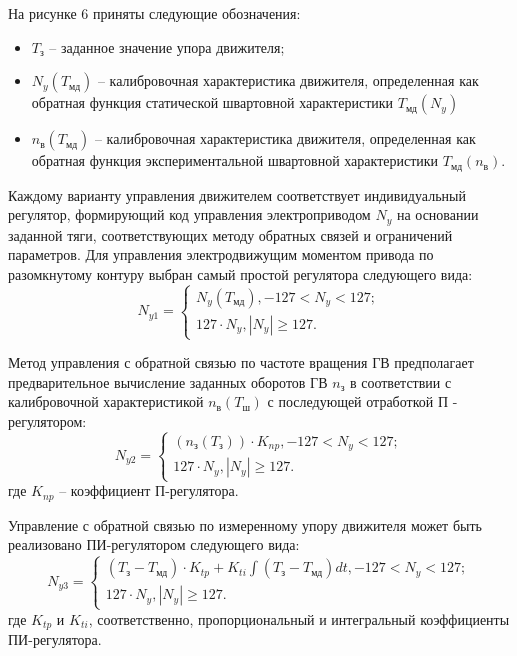 На рисунке 6 приняты следующие обозначения:  
\begin{itemize}
    \item $T_{\text{з}}$ -- заданное значение упора движителя;
    \item $N_y(T_{\text{мд}})$ -- калибровочная характеристика движителя, определенная как обратная функция статической швартовной характеристики $T_{\text{мд}}(N_y)$
    \item $n_{\text{в}}(T_{\text{мд}})$ -- калибровочная характеристика движителя, определенная как обратная функция экспериментальной швартовной характеристики $T_{\text{мд}}(n_{\text{в}})$.
\end{itemize}

Каждому варианту управления движителем соответствует индивидуальный регулятор, формирующий код управления электроприводом $N_y$ на основании заданной тяги, соответствующих методу обратных связей и ограничений параметров.
Для управления электродвижущим моментом привода по разомкнутому контуру выбран самый простой регулятора следующего вида:
\begin{equation}
    \label{eq:thruster_control_torque}
    N_{y1} = 
    \left\{
    \begin{array}{l}
        N_y(T_{\text{мд}}), -127 < N_y < 127; \\
        127 \cdot N_y, |N_y| \geq 127.
    \end{array}
    \right.
\end{equation}

Метод управления с обратной связью по частоте вращения ГВ предполагает предварительное вычисление заданных оборотов ГВ $n_{\text{з}}$ в соответствии с калибровочной характеристикой $n_{\text{в}}(T_{\text{ш}})$ с последующей отработкой П - регулятором:
\begin{equation}
    \label{eq:thruster_control_rotation}
    N_{y2} = 
    \left\{
    \begin{array}{l}
        (n_{\text{з}}(T_{\text{з}})) \cdot K_{np}, -127 < N_y < 127; \\
        127 \cdot N_y, |N_y| \geq 127.
    \end{array}
    \right.
\end{equation}
\noindent где $K_{np}$ -- коэффициент П-регулятора.

Управление с обратной связью по измеренному упору движителя может быть реализовано ПИ-регулятором следующего вида:
\begin{equation}
    \label{eq:thruster_control_thrust}
    N_{y3} = 
    \left\{
    \begin{array}{l}
        (T_\text{з} - T_\text{мд}) \cdot K_{tp} +K_{ti} \int(T_\text{з} - T_\text{мд}) dt , -127 < N_y < 127; \\
        127 \cdot N_y, |N_y| \geq 127.
    \end{array}
    \right.
\end{equation}
\noindent где $K_{tp}$ и $K_{ti}$, соответственно, пропорциональный и интегральный коэффициенты ПИ-регулятора.

